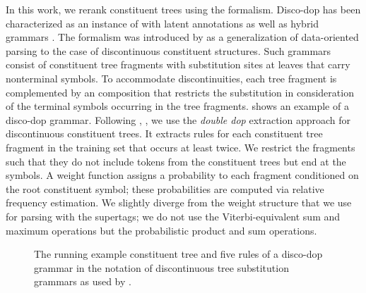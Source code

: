 \documentclass[../../document.tex]{subfiles}
\begin{document}
    In this work, we rerank constituent trees using the  formalism.
    Disco-dop has been characterized as an instance of  with latent annotations \citep[Section~4]{Cra11} as well as hybrid grammars \citep[Section~8.5.1]{Geb20}.
    The formalism was introduced by \citet{Cra11} as a generalization of data-oriented parsing \citep{Bod92} to the case of discontinuous constituent structures.
    Such grammars consist of constituent tree fragments with substitution sites at leaves that carry nonterminal symbols.
    To accommodate discontinuities, each tree fragment is complemented by an  composition that restricts the substitution in consideration of the terminal symbols occurring in the tree fragments.
     shows an example of a disco-dop grammar.
    Following \citet{San11}, \citet{Cra11}, we use the \emph{double dop} extraction approach for discontinuous constituent trees.
    It extracts rules for each constituent tree fragment in the training set that occurs at least twice.
    We restrict the fragments such that they do not include tokens from the constituent trees but end at the  symbols.
    A weight function assigns a probability to each fragment conditioned on the root constituent symbol; these probabilities are computed via relative frequency estimation.
    We slightly diverge from the weight structure that we use for parsing with the supertags; we do not use the Viterbi-equivalent sum and maximum operations but the probabilistic product and sum operations.
    
    \begin{figure}
        \null\hfill
        
        \hspace{1cm}
        
        \hfill\null
        \caption{\label{fig:ex:dop}
            The running example constituent tree and five rules of a disco-dop grammar in the notation of discontinuous tree substitution grammars as used by \citet{CraSchBod16}.}
    \end{figure}
\end{document}
